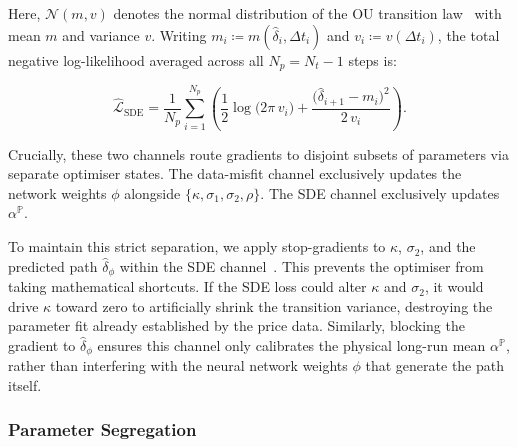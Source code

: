\documentclass[11pt, a4paper]{article}
\begin{document}
Here, $\mathcal{N}(m, v)$ denotes the normal distribution of the OU transition law~\cite{uhlenbeck1930theory, vasicek1977equilibrium} with mean $m$ and variance $v$. Writing $m_i \coloneqq m(\hat{\delta}_i, \Delta t_i)$ and $v_i \coloneqq v(\Delta t_i)$, the total negative log-likelihood averaged across all $N_p = N_t - 1$ steps is:

\begin{equation}
    \hat{\mathcal{L}}_{\text{SDE}} = \frac{1}{N_p}
  \sum_{i=1}^{N_p} \left(
    \frac{1}{2}\log\!\big(2\pi\, v_i\big)
      + \frac{\big(\hat{\delta}_{i+1} - m_i\big)^2}{2\,v_i} \right).
\end{equation}

Crucially, these two channels route gradients to disjoint subsets of parameters via separate optimiser states. The data-misfit channel exclusively updates the network weights $\phi$ alongside $\{\kappa, \sigma_1, \sigma_2, \rho\}$. The SDE channel exclusively updates $\alpha^{\mathbb{P}}$.

To maintain this strict separation, we apply stop-gradients to $\kappa$, $\sigma_2$, and the predicted path $\hat\delta_\phi$ within the SDE channel~\cite{bradbury2018jax}. This prevents the optimiser from taking mathematical shortcuts. If the SDE loss could alter $\kappa$ and $\sigma_2$, it would drive $\kappa$ toward zero to artificially shrink the transition variance, destroying the parameter fit already established by the price data. Similarly, blocking the gradient to $\hat\delta_\phi$ ensures this channel only calibrates the physical long-run mean $\alpha^{\mathbb{P}}$, rather than interfering with the neural network weights $\phi$ that generate the path itself.

\subsubsection{Parameter Segregation}
\label{sec:alternating}
\end{document}
